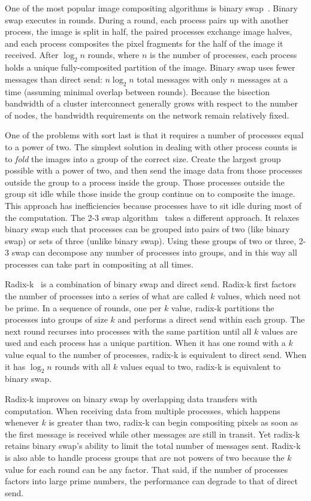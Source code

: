 \documentclass{acm_proc_article-sp}
\newcommand*{\lcite}[1]{~\cite{#1}}
\newcommand*{\keyterm}[1]{\emph{#1}}
\begin{document}
One of the most popular image compositing algorithms is binary
swap\lcite{BinarySwap1,BinarySwap2}.  Binary swap executes in rounds.
During a round, each process pairs up with another process, the image is
split in half, the paired processes exchange image halves, and each process
composites the pixel fragments for the half of the image it received.
After $\log_{2} n$ rounds, where $n$ is the number of processes, each
process holds a unique fully-composited partition of the image.  Binary
swap uses fewer messages than direct send: $n \log_{2} n$ total messages
with only $n$ messages at a time (assuming minimal overlap between
rounds).  Because the bisection bandwidth of a cluster interconnect
generally grows with respect to the number of nodes, the bandwidth
requirements on the network remain relatively fixed.

One of the problems with sort last is that it requires a number of
processes equal to a power of two.  The simplest solution in dealing with
other process counts is to \keyterm{fold} the images into a group of the
correct size.  Create the largest group possible with a power of two, and
then send the image data from those processes outside the group to a
process inside the group.  Those processes outside the group sit idle while
those inside the group continue on to composite the image.  This approach
has inefficiencies because processes have to sit idle during most of the
computation.  The 2-3 swap algorithm\lcite{23Swap} takes a different
approach.  It relaxes binary swap such that processes can be grouped into
pairs of two (like binary swap) or sets of three (unlike binary swap).
Using these groups of two or three, 2-3 swap can decompose any number of
processes into groups, and in this way all processes can take part in
compositing at all times.

Radix-k\lcite{RadixK} is a combination of binary swap and direct send.
Radix-k first factors the number of processes into a series of what are
called $k$ values, which need not be prime.  In a sequence of rounds, one
per $k$ value, radix-k partitions the processes into groups of size $k$ and
performs a direct send within each group.  The next round recurses into
processes with the same partition until all $k$ values are used and each
process has a unique partition.  When it has one round with a $k$ value
equal to the number of processes, radix-k is equivalent to direct send.
When it has $\log_{2} n$ rounds with all $k$ values equal to two, radix-k
is equivalent to binary swap.

Radix-k improves on binary swap by overlapping data transfers with
computation.  When receiving data from multiple processes, which happens
whenever $k$ is greater than two, radix-k can begin compositing pixels as
soon as the first message is received while other messages are still in
transit.  Yet radix-k retains binary swap's ability to limit the total
number of messages sent.  Radix-k is also able to handle process groups
that are not powers of two because the $k$ value for each round can be any
factor.  That said, if the number of processes factors into large prime
numbers, the performance can degrade to that of direct send.
\end{document}
